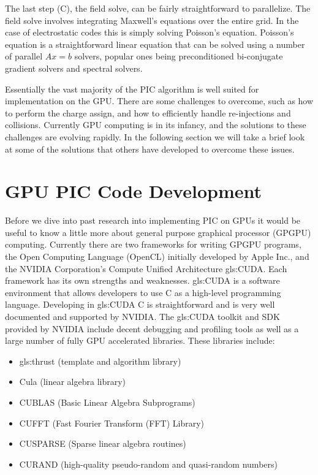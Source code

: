 The last step (C), the field solve, can be fairly straightforward to parallelize. The field solve involves integrating Maxwell's equations over the entire grid. In the case of electrostatic codes this is simply solving Poisson's equation. Poisson's equation is a straightforward linear equation that can be solved using a number of parallel $Ax=b$ solvers, popular ones being preconditioned bi-conjugate gradient solvers and spectral solvers.

Essentially the vast majority of the PIC algorithm is well suited for implementation on the GPU. There are some challenges to overcome, such as how to perform the charge assign, and how to efficiently handle re-injections and collisions. Currently GPU computing is in its infancy, and the solutions to these challenges are evolving rapidly. In the following section we will take a brief look at some of the solutions that others have developed to overcome these issues. 

		\section{GPU PIC Code Development}
	Before we dive into past research into implementing PIC on GPUs it would be useful to know a little more about general purpose graphical processor (GPGPU) computing. Currently there are two frameworks for writing GPGPU programs, the Open Computing Language (OpenCL) initially developed by Apple Inc., and the NVIDIA Corporation's Compute Unified Architecture \gls{gls:CUDA}.\cite{NVIDIACorporation2012d,NVIDIACorporation2011} Each framework has its own strengths and weaknesses. \gls{gls:CUDA} is a software environment that allows developers to use C as a high-level programming language. Developing in \gls{gls:CUDA} C is straightforward and is very well documented and supported by NVIDIA. The \gls{gls:CUDA} toolkit and SDK provided by NVIDIA include decent debugging and profiling tools as well as a large number of fully GPU accelerated libraries. These libraries include:

\begin{itemize}
\item \gls{gls:thrust} (template and algorithm library)\cite{NVIDIACorporation2011a}
\item Cula (linear algebra library)
\item CUBLAS (Basic Linear Algebra Subprograms)\cite{NVIDIACorporation2012}
\item CUFFT (Fast Fourier Transform (FFT) Library)\cite{NVIDIACorporation2012a}
\item CUSPARSE (Sparse linear algebra routines)\cite{NVIDIACorporation2012c}
\item CURAND (high-quality pseudo-random and quasi-random numbers)\cite{NVIDIACorporation2012b}
\end{itemize}

